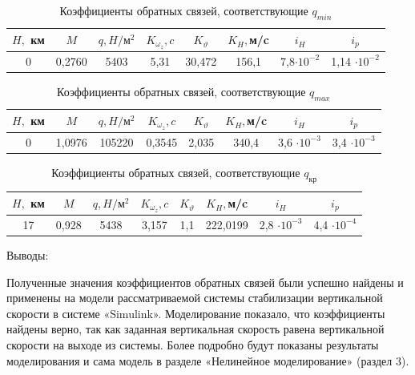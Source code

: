 \begin{table}[H]
    \centering
    \caption{Коэффициенты обратных связей, соответствующие $q_{min}$}
    \begin{tabular}{|c|c|c|c|c|c|c|c|}
    \hline
        $H,$ км & $M$ & $q, H / \text{м}^2$ & $K_{\omega_z}, c$ & $K_\vartheta$ & $K_H,$м/c &$i_H$&$i_p$\\ \hline
        0& 0,2760& 5403  &5,31 & 30,472&156,1 &7,8$\cdot 10^{-2}$&1,14 $\cdot 10^{-2}$\\ \hline
    \end{tabular}
    \label{tab:q_min}
\end{table}

\begin{table}[H]
    \centering
    \caption{Коэффициенты обратных связей, соответствующие $q_{max}$}
    \begin{tabular}{|c|c|c|c|c|c|c|c|}
    \hline
        $H,$ км & $M$ & $q, H / \text{м}^2$ & $K_{\omega_z}, c$ & $K_\vartheta$ & $K_H,$м/c &$i_H$&$i_p$ \\ \hline
        0& 1,0976 &105220& 0,3545 & 2,035&340,4&3,6 $\cdot 10^{-3}$&3,4 $\cdot 10^{-3}$\\ \hline
    \end{tabular}
    \label{tab:q_max}
\end{table}


\begin{table}[H]
    \centering
    \caption{Коэффициенты обратных связей, соответствующие $q_\text{кр}$}
    \begin{tabular}{|c|c|c|c|c|c|c|c|}
    \hline
        $H,$ км & $M$ & $q, H / \text{м}^2$ & $K_{\omega_z}, c$ & $K_\vartheta$ & $K_H,$м/c &$i_H$&$i_p$ \\ \hline
        17&0,928&5438 &3,157 & 1,1 &222,0199 &2,8 $\cdot 10^{-3}$&4,4 $\cdot 10^{-4}$\\ \hline
    \end{tabular}
    \label{tab:q_kr}
\end{table}

\begin{center}
    Выводы:
\end{center}

Полученные значения коэффициентов обратных связей были успешно найдены и применены на модели рассматриваемой системы стабилизации вертикальной скорости в системе «Simulink». Моделирование показало, что коэффициенты найдены верно, так как заданная вертикальная скорость равена вертикальной скорости на выходе из системы. Более подробно будут показаны результаты моделирования и сама модель в разделе «Нелинейное моделирование» (раздел 3).


